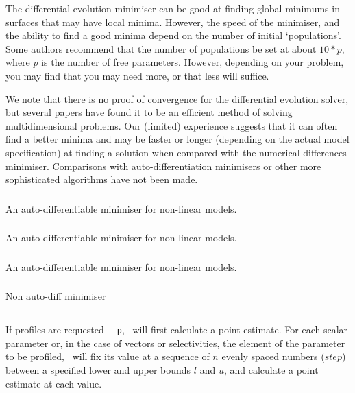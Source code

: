 The differential evolution minimiser can be good at finding global minimums in surfaces that may have local minima. However, the speed of the minimiser, and the ability to find a good minima depend on the number of initial `populations'. Some authors recommend that the number of populations be set at about $10*p$, where $p$ is the number of free parameters. However, depending on your problem, you may find that you may need more, or that less will suffice.

We note that there is no proof of convergence for the differential evolution solver, but several papers have found it to be an efficient method of solving multidimensional problems. Our (limited) experience suggests that it can often find a better minima and may be faster or longer (depending on the actual model specification) at finding a solution when compared with the numerical differences minimiser. Comparisons with auto-differentiation minimisers or other more sophisticated algorithms have not been made. 

\subsubsection{}
An auto-differentiable minimiser for non-linear models.
\subsubsection{}
An auto-differentiable minimiser for non-linear models.
\subsubsection{}
An auto-differentiable minimiser for non-linear models.
\subsubsection{}
Non auto-diff minimiser


\subsection{\label{sec:estimate-profiles}}
If profiles are requested \texttt{\cname\ -p}, \CNAME\ will first calculate a point estimate. For each scalar parameter or, in the case of vectors or selectivities, the element of the parameter to be profiled, \CNAME\ will fix its value at a sequence of $n$ evenly spaced numbers ($step$) between a specified lower and upper bounds $l$ and $u$, and calculate a point estimate at each value. 

